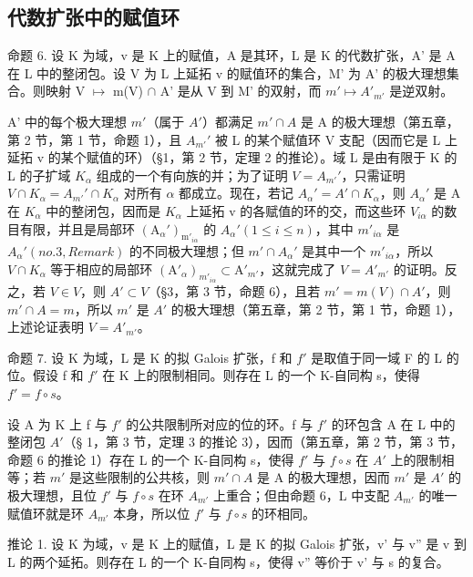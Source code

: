 \subsection{代数扩张中的赋值环}

命题 6. 设 K 为域，v 是 K 上的赋值，A 是其环，L 是 K 的代数扩张，A' 是 A 在 L 中的整闭包。设 V 为 L 上延拓 v 的赋值环的集合，M' 为 A' 的极大理想集合。则映射 V \(\mapsto\) m(V) \(\cap\) A' 是从 V 到 M' 的双射，而 \(m' \mapsto A'_{m'}\) 是逆双射。

A' 中的每个极大理想 \(m'\)（属于 \(A'\)）都满足 \(m' \cap A\) 是 A 的极大理想（第五章，第 2 节，第 1 节，命题 1），且 \(A_{m'}'\) 被 L 的某个赋值环 V 支配（因而它是 L 上延拓 v 的某个赋值的环）（§1，第 2 节，定理 2 的推论）。域 L 是由有限于 K 的 L 的子扩域 \(K_{\alpha}\) 组成的一个有向族的并；为了证明 \(V = A_{m'}'\)，只需证明 \(V \cap K_{\alpha} = A_{m'}' \cap K_{\alpha}\) 对所有 \(\alpha\) 都成立。现在，若记 \(A_{\alpha}' = A' \cap K_{\alpha}\)，则 \(A_{\alpha}'\) 是 A 在 \(K_{\alpha}\) 中的整闭包，因而是 \(K_{\alpha}\) 上延拓 v 的各赋值的环的交，而这些环 \(V_{i\alpha}\) 的数目有限，并且是局部环 \((\mathrm{A}_{\alpha}')_{\mathrm{m}'_{i\alpha}}\) 的 \(A_{\alpha}' (1 \leqslant i \leqslant n)\)，其中 \(m'_{i\alpha}\) 是 \(A_{\alpha}' (no. 3, Remark)\) 的不同极大理想；但 \(m' \cap A_{\alpha}'\) 是其中一个 \(m'_{i\alpha}\)，所以 \(V \cap K_{\alpha}\) 等于相应的局部环 \((\mathrm{A}'_{\alpha})_{m'_{i\alpha}} \subset \mathrm{A}'_{m'}\)，这就完成了 \(V = A'_{m'}\) 的证明。反之，若 \(V \in V\)，则 \(A' \subset V\)（§3，第 3 节，命题 6），且若 \(m' = m(V) \cap A'\)，则 \(m' \cap A = m\)，所以 \(m'\) 是 \(A'\) 的极大理想（第五章，第 2 节，第 1 节，命题 1），上述论证表明 \(V = A'_{m'}\)。

命题 7. 设 K 为域，L 是 K 的拟 Galois 扩张，f 和 \(f'\) 是取值于同一域 F 的 L 的位。假设 f 和 \(f'\) 在 K 上的限制相同。则存在 L 的一个 K-自同构 s，使得 \(f' = f \circ s\)。

设 A 为 K 上 f 与 \(f'\) 的公共限制所对应的位的环。f 与 \(f'\) 的环包含 A 在 L 中的整闭包 \(A'\)（§ 1，第 3 节，定理 3 的推论 3），因而（第五章，第 2 节，第 3 节，命题 6 的推论 1）存在 L 的一个 K-自同构 s，使得 \(f'\) 与 \(f \circ s\) 在 \(A'\) 上的限制相等；若 \(m'\) 是这些限制的公共核，则 \(m' \cap A\) 是 A 的极大理想，因而 \(m'\) 是 \(A'\) 的极大理想，且位 \(f'\) 与 \(f \circ s\) 在环 \(A_{m'}\) 上重合；但由命题 6，L 中支配 \(A_{m'}\) 的唯一赋值环就是环 \(A_{m'}\) 本身，所以位 \(f'\) 与 \(f \circ s\) 的环相同。

推论 1. 设 K 为域，v 是 K 上的赋值，L 是 K 的拟 Galois 扩张，v' 与 v'' 是 v 到 L 的两个延拓。则存在 L 的一个 K-自同构 s，使得 v'' 等价于 v' 与 s 的复合。

